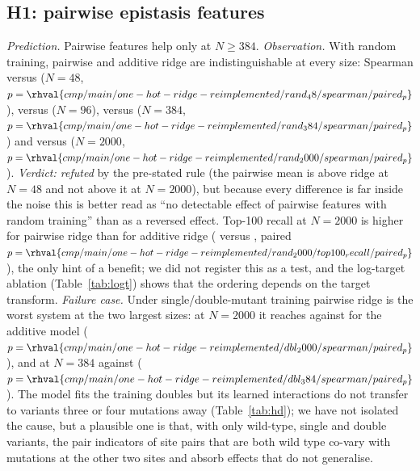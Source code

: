 \subsection{H1: pairwise epistasis features}
\emph{Prediction.} Pairwise features help only at $N\ge384$. \emph{Observation.} With random training, pairwise and additive ridge are indistinguishable at every size: Spearman  versus  ($N{=}48$, $p=\rhval{cmp/main/one-hot-ridge-reimplemented/rand_48/spearman/paired_p}$),  versus  ($N{=}96$),  versus  ($N{=}384$, $p=\rhval{cmp/main/one-hot-ridge-reimplemented/rand_384/spearman/paired_p}$) and  versus  ($N{=}2000$, $p=\rhval{cmp/main/one-hot-ridge-reimplemented/rand_2000/spearman/paired_p}$). \emph{Verdict: refuted} by the pre-stated rule (the pairwise mean is above ridge at $N{=}48$ and not above it at $N{=}2000$), but because every difference is far inside the noise this is better read as ``no detectable effect of pairwise features with random training'' than as a reversed effect. Top-100 recall at $N{=}2000$ is higher for pairwise ridge than for additive ridge ( versus , paired $p=\rhval{cmp/main/one-hot-ridge-reimplemented/rand_2000/top100_recall/paired_p}$), the only hint of a benefit; we did not register this as a test, and the log-target ablation (Table~\ref{tab:logt}) shows that the ordering depends on the target transform.
\emph{Failure case.} Under single/double-mutant training pairwise ridge is the worst system at the two largest sizes: at $N{=}2000$ it reaches  against  for the additive model ($p=\rhval{cmp/main/one-hot-ridge-reimplemented/dbl_2000/spearman/paired_p}$), and at $N{=}384$  against  ($p=\rhval{cmp/main/one-hot-ridge-reimplemented/dbl_384/spearman/paired_p}$). The model fits the training doubles but its learned interactions do not transfer to variants three or four mutations away (Table~\ref{tab:hd}); we have not isolated the cause, but a plausible one is that, with only wild-type, single and double variants, the pair indicators of site pairs that are both wild type co-vary with mutations at the other two sites and absorb effects that do not generalise.

